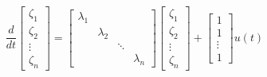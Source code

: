 \documentclass[a4paper,10pt,oneside]{book}
\begin{document}
\begin{equation}\label{diagonal45}
 \frac{d}{dt}\left[ {\begin{array}{c}
 \zeta_1 \\
 \zeta_2 \\
 \vdots  \\
 \zeta_n
 \end{array} } \right] = 
\left[ {\begin{array}{cccc}
 \lambda_1 & & & \\
 & \lambda_2 & & \\
 & & \ddots & \\
 & & & \lambda_n
 \end{array} } \right]
\left[ {\begin{array}{c}
 \zeta_1 \\
 \zeta_2 \\
 \vdots  \\
 \zeta_n
 \end{array} } \right]+
\left[ {\begin{array}{c}
 1 \\
 1 \\
 \vdots  \\
 1
 \end{array} } \right]
 u(t)
\end{equation} 
\end{document}
